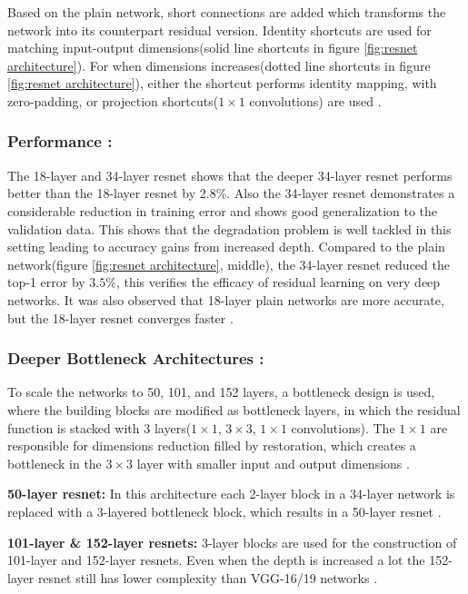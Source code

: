 Based on the plain network, short connections are added which transforms the network into its counterpart residual version. Identity shortcuts are used for matching input-output dimensions(solid line shortcuts in figure \ref{fig:resnet architecture}). For when dimensions increases(dotted line shortcuts in figure \ref{fig:resnet architecture}), either the shortcut performs identity mapping, with zero-padding, or projection shortcuts($1\times1$ convolutions) are used \cite{he2016deep}.

\subsubsection*{Performance :}

The 18-layer and 34-layer \gls{resnet} shows that the deeper 34-layer \gls{resnet} performs better than the 18-layer \gls{resnet} by 2.8\%. Also the 34-layer \gls{resnet} demonstrates a considerable reduction in training error and shows good generalization to the validation data. This shows that the degradation problem is well tackled in this setting leading to accuracy gains from increased depth. Compared to the plain network(figure \ref{fig:resnet architecture}, middle), the 34-layer \gls{resnet} reduced the top-1 error by $3.5\%$, this verifies the efficacy of residual learning on very deep networks. It was also observed that 18-layer plain networks are more accurate, but the 18-layer \gls{resnet} converges faster \cite{he2016deep}.

\subsubsection*{Deeper Bottleneck Architectures :}

To scale the networks to 50, 101, and 152 layers, a bottleneck design is used, where the building blocks are modified as bottleneck layers, in which the residual function is stacked with 3 layers($1\times1$, $3\times3$, $1\times1$ convolutions). The $1\times1$ are responsible for dimensions reduction filled by restoration, which creates a bottleneck in the $3\times3$ layer with smaller input and output dimensions \cite{he2016deep}.

\textbf{50-layer \gls{resnet}:} In this architecture each 2-layer block in a 34-layer network is replaced with a 3-layered bottleneck block, which results in a 50-layer \gls{resnet} \cite{he2016deep}.

\textbf{101-layer \& 152-layer \glspl{resnet}:} 3-layer blocks are used for the construction of 101-layer and 152-layer \glspl{resnet}. Even when the depth is increased a lot the 152-layer \gls{resnet} still has lower complexity than VGG-16/19 networks \cite{he2016deep}.


